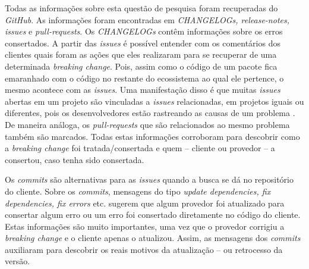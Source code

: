 Todas as informações sobre esta questão de pesquisa foram recuperadas do \textit{GitHub}. As informações foram encontradas em \textit{CHANGELOGs, release-notes, issues} e \textit{pull-requests}. Os \textit{CHANGELOGs} contêm informações sobre os erros consertados. A partir das \textit{issues} é possível entender com os comentários dos clientes quais foram as ações que eles realizaram para se recuperar de uma determinada \textit{breaking change}. Pois, assim como o código de um pacote fica emaranhado com o código no restante do ecossistema ao qual ele pertence, o mesmo acontece com as \textit{issues}. Uma manifestação disso é que muitas \textit{issues} abertas em um projeto são vinculadas a \textit{issues} relacionadas, em projetos iguais ou diferentes, pois os desenvolvedores estão rastreando as causas de um problema \cite{Zhang:2018:WIL:3242887.3242891}. De maneira análoga, os \textit{pull-requests} que são relacionados ao mesmo problema também são marcados. Todas estas informações corroboram para descobrir como a \textit{breaking change} foi tratada/consertada e quem -- cliente ou provedor -- a consertou, caso tenha sido consertada.

Os \textit{commits} são alternativas para as \textit{issues} quando a busca se dá no repositório do cliente. Sobre os \textit{commits}, mensagens do tipo \textit{update dependencies, fix dependencies, fix errors} etc. sugerem que algum provedor foi atualizado para consertar algum erro ou um erro foi consertado diretamente no código do cliente. Estas informações são muito importantes, uma vez que o provedor corrigiu a \textit{breaking change} e o cliente apenas o atualizou. Assim, as mensagens dos \textit{commits} auxiliaram para descobrir os reais motivos da atualização -- ou retrocesso da versão.